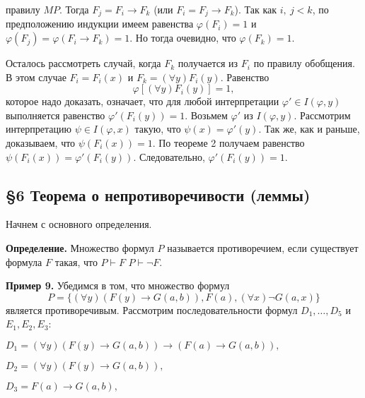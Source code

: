\documentclass[a4paper]{article}
\begin{document}

правилу $MP$. Тогда $F_j = F_i \rightarrow F_k$ (или $F_i = F_j \rightarrow F_k$). Так как $i,\ j < k$, по предположению индукции имеем равенства $\varphi (F_i) = 1$ и $\varphi (F_j) = \varphi(F_i \rightarrow F_k) = 1$. Но тогда очевидно, что $\varphi(F_k ) = 1$.

Осталось рассмотреть случай, когда $F_k$ получается из $F_i$ по правилу обобщения. В этом случае $F_i = F_i(x)$ и $F_k = (\forall y)F_i(y)$.
Равенство
$$
\varphi[(\forall y)F_i(y)] = 1,
$$
которое надо доказать, означает, что для любой интерпретации $\varphi' \in I(\varphi, y)$ выполняется равенство $\varphi' (F_i(y)) = 1$. Возьмем $\varphi'$ из $I(\varphi, y)$. Рассмотрим интерпретацию $\psi \in I(\varphi, x)$ такую, что $\psi(x) = \varphi'(y)$. Так же, как и раньше, доказываем, что $\psi (F_i(x)) = 1$. По теореме 2 получаем равенство $\psi(F_i(x)) = \varphi' (F_i(y))$. Следовательно, $\varphi' (F_i(y)) = 1$.

\subsection{\S6 Теорема о непротиворечивости (леммы)}

Начнем с основного определения.

\textbf{Определение.} Множество формул $P$ называется противоречием, если существует формула $F$ такая, что $P \vdash F$ $P \vdash \neg F$.

\textbf{Пример 9.} Убедимся в том, что множество формул 
$$
	P = \{(\forall y)(F(y) \rightarrow G(a, b)), F(a), (\forall x)\neg G(a, x)\}
$$
является противоречивым. Рассмотрим последовательности формул $D_1, \dots, D_5$ и $E_1, E_2, E_3$:

$D_1 = (\forall y)(F(y) \rightarrow G(a, b)) \rightarrow (F(a) \rightarrow G(a, b)),$

$D_2 = (\forall y)(F(y) \rightarrow G(a, b)),$

$D_3 = F(a) \rightarrow G(a, b), $
\end{document}
